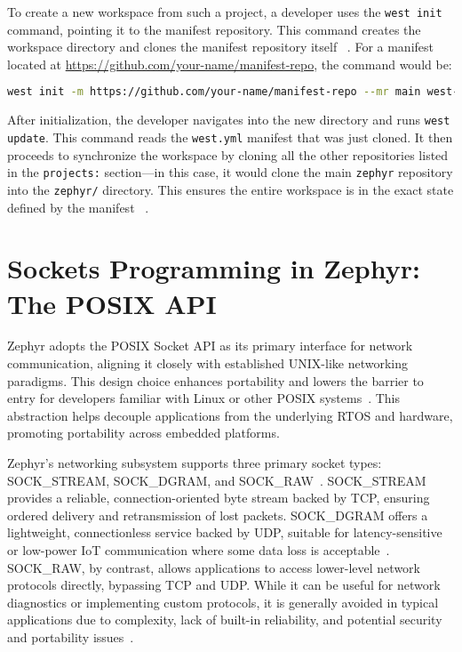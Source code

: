 To create a new workspace from such a project, a developer uses the \texttt{west init} command, pointing it to the manifest repository. This command creates the workspace directory and clones the manifest repository itself ~\cite{zephyr_west}. For a manifest located at \url{https://github.com/your-name/manifest-repo}, the command would be:

\medskip

\begin{lstlisting}[language=bash]
west init -m https://github.com/your-name/manifest-repo --mr main west-workspace-path
\end{lstlisting}

After initialization, the developer navigates into the new directory and runs \texttt{west update}. This command reads the \texttt{west.yml} manifest that was just cloned. It then proceeds to synchronize the workspace by cloning all the other repositories listed in the \texttt{projects:} section—in this case, it would clone the main \texttt{zephyr} repository into the \texttt{zephyr/} directory. This ensures the entire workspace is in the exact state defined by the manifest ~\cite{zephyr_west}.

\section{Sockets Programming in Zephyr: The POSIX API}

Zephyr adopts the POSIX Socket API as its primary interface for network communication, aligning it closely with established UNIX-like networking paradigms. This design choice enhances portability and lowers the barrier to entry for developers familiar with Linux or other POSIX systems~\cite{zephyr_sockets_api}. This abstraction helps decouple applications from the underlying RTOS and hardware, promoting portability across embedded platforms.

Zephyr's networking subsystem supports three primary socket types: SOCK\_STREAM, SOCK\_DGRAM, and SOCK\_RAW~\cite{zephyr_sockets_api}. SOCK\_STREAM provides a reliable, connection-oriented byte stream backed by TCP, ensuring ordered delivery and retransmission of lost packets. SOCK\_DGRAM offers a lightweight, connectionless service backed by UDP, suitable for latency-sensitive or low-power IoT communication where some data loss is acceptable~\cite{oracle_sockets}. SOCK\_RAW, by contrast, allows applications to access lower-level network protocols directly, bypassing TCP and UDP. While it can be useful for network diagnostics or implementing custom protocols, it is generally avoided in typical applications due to complexity, lack of built-in reliability, and potential security and portability issues~\cite{raw_sockets_limitations}.

